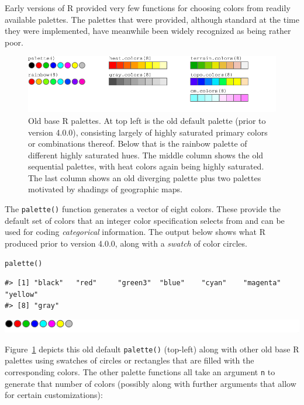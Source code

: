 Early versions of R provided very few functions for choosing colors from readily available palettes. The palettes
that were provided, although standard at the time they were implemented,
have meanwhile
been widely recognized as being rather poor.

\begin{figure}[ht!]

{\centering \includegraphics[width=1\linewidth]{color_files/figure-latex/oldPalettes-1} 

}

\caption{Old base R palettes.  At top left is the old default palette (prior to version 4.0.0), consisting largely of highly saturated primary colors or combinations thereof.  Below that is the rainbow palette of different highly saturated hues.  The middle column shows the old sequential palettes, with heat colors again being highly saturated.  The last column shows an old diverging palette plus two palettes motivated by shadings of geographic maps.}\label{fig:oldPalettes}
\end{figure}

The \texttt{palette()} function generates a vector of eight colors.
These provide the default set of colors that an integer color specification selects from
and can be used for coding \emph{categorical} information.
The output below shows what R produced prior to version 4.0.0, along with a
\emph{swatch} of color circles.

\begin{verbatim}
palette()
\end{verbatim}

\begin{verbatim}
#> [1] "black"   "red"     "green3"  "blue"    "cyan"    "magenta" "yellow" 
#> [8] "gray"
\end{verbatim}

\includegraphics[width=1\linewidth]{color_files/figure-latex/R3-1}

Figure~\ref{fig:oldPalettes}
depicts this old default \texttt{palette()} (top-left) along
with other old base R palettes using swatches of circles or
rectangles that are filled with the
corresponding colors. The other palette functions all take an argument \texttt{n} to generate
that number of colors (possibly along with further arguments that allow for
certain customizations):

